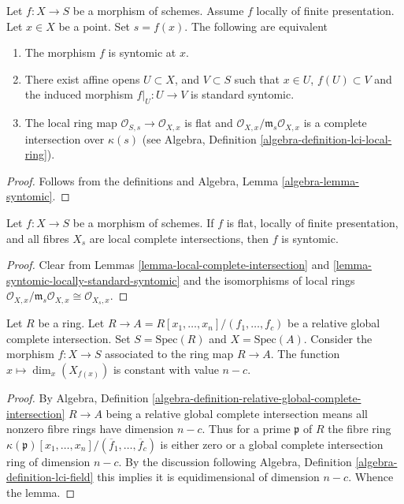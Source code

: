 \begin{lemma}
\label{lemma-syntomic-locally-standard-syntomic}
Let $f : X  \to S$ be a morphism of schemes.
Assume $f$ locally of finite presentation.
Let $x \in X$ be a point.
Set $s = f(x)$.
The following are equivalent
\begin{enumerate}
\item The morphism $f$ is syntomic at $x$.
\item There exist affine opens $U \subset X$,
and $V \subset S$ such that $x \in U$, $f(U) \subset V$ and the
induced morphism $f|_U : U \to V$ is standard syntomic.
\item The local ring map $\mathcal{O}_{S, s} \to \mathcal{O}_{X, x}$
is flat and $\mathcal{O}_{X, x}/\mathfrak m_s \mathcal{O}_{X, x}$
is a complete intersection over $\kappa(s)$ (see
Algebra, Definition \ref{algebra-definition-lci-local-ring}).
\end{enumerate}
\end{lemma}

\begin{proof}
Follows from the definitions and
Algebra, Lemma \ref{algebra-lemma-syntomic}.
\end{proof}

\begin{lemma}
\label{lemma-syntomic-flat-fibres}
Let $f : X \to S$ be a morphism of schemes.
If $f$ is flat, locally of finite presentation, and all
fibres $X_s$ are local complete intersections, then $f$
is syntomic.
\end{lemma}

\begin{proof}
Clear from Lemmas
\ref{lemma-local-complete-intersection} and
\ref{lemma-syntomic-locally-standard-syntomic}
and the isomorphisms of local rings
$
\mathcal{O}_{X, x}/\mathfrak m_s \mathcal{O}_{X, x}
\cong
\mathcal{O}_{X_s, x}
$.
\end{proof}

\begin{lemma}
\label{lemma-standard-syntomic-relative-dimension}
Let $R$ be a ring.
Let $R \to A = R[x_1, \ldots, x_n]/(f_1, \ldots, f_c)$ be a relative
global complete intersection. Set $S = \text{Spec}(R)$ and
$X = \text{Spec}(A)$. Consider the morphism
$f : X \to S$ associated to the ring map $R \to A$.
The function $x \mapsto \dim_x(X_{f(x)})$ is constant with value $n - c$.
\end{lemma}

\begin{proof}
By Algebra,
Definition \ref{algebra-definition-relative-global-complete-intersection}
$R \to A$ being a relative global complete intersection means
all nonzero fibre rings have dimension $n - c$.
Thus for a prime $\mathfrak p$ of $R$ the fibre ring 
$\kappa(\mathfrak p)[x_1, \ldots, x_n]/(\overline{f}_1, \ldots, \overline{f}_c)$
is either zero or a global complete intersection ring of dimension $n - c$.
By the discussion following
Algebra, Definition \ref{algebra-definition-lci-field}
this implies it is equidimensional of dimension $n - c$.
Whence the lemma.
\end{proof}

